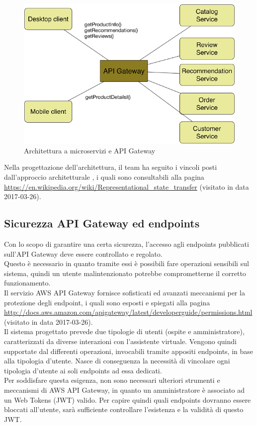 \begin{figure}[h]
	\centering
	\includegraphics[width=\textwidth,height=\textheight,keepaspectratio,scale=0.1]{images/apigateway1.png}
	\caption{Architettura a microservizi e API Gateway}\label{fig:apig1}
\end{figure}
\newpage
Nella progettazione dell'architettura, il team ha seguito i vincoli posti dall'approccio architetturale , i quali sono consultabili alla pagina \url{https://en.wikipedia.org/wiki/Representational_state_transfer} (visitato in data 2017-03-26).
\subsection{Sicurezza API Gateway ed endpoints}
Con lo scopo di garantire una certa sicurezza, l'accesso agli endpoints pubblicati sull'API Gateway deve essere controllato e regolato. \\Questo è necessario in quanto tramite essi è possibili fare operazioni sensibili sul sistema, quindi un utente malintenzionato potrebbe comprometterne il corretto funzionamento.\\ 
Il servizio AWS API Gateway fornisce sofisticati ed avanzati meccanismi per la protezione degli endpoint, i quali sono esposti e spiegati alla pagina \url{http://docs.aws.amazon.com/apigateway/latest/developerguide/permissions.html} (visitato in data 2017-03-26). \\

Il sistema progettato prevede due tipologie di utenti (ospite e amministratore), caratterizzati da diverse interazioni con l'assistente virtuale. Vengono quindi supportate dal  differenti operazioni, invocabili tramite appositi endpoints, in base alla tipologia d'utente. Nasce di conseguenza la necessità di vincolare ogni tipologia d'utente ai soli endpoints ad essa dedicati. \\
Per soddisfare questa esigenza, non sono necessari ulteriori strumenti e meccanismi di AWS API Gateway, in quanto un amministratore è associato ad un  Web Tokens (JWT) valido. Per capire quindi quali endpoints dovranno essere bloccati all'utente, sarà sufficiente controllare l'esistenza e la validità di questo JWT.
